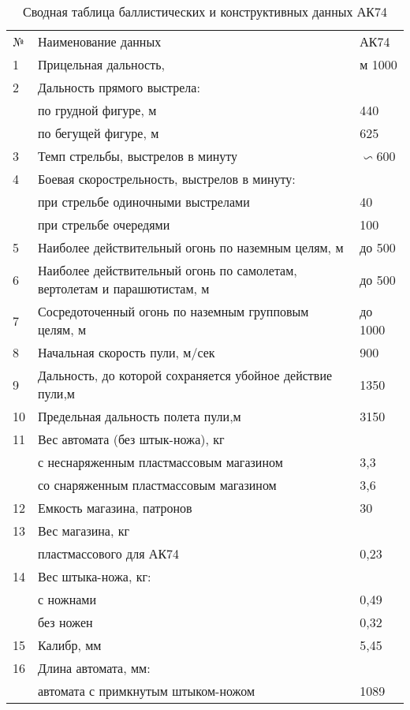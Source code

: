 \documentclass[12pt,a4paper]{report}
\begin{document}
\newpage
\begin{table}[h!]
\caption{Сводная таблица баллистических и конструктивных данных АК74}
\label{tabular:AK74}
\begin{center}
\begin{tabular}{|l|p{11cm}|l|}
	\hline
	\rowcolor[gray]{.9} № & Наименование данных &  АК74\\
	 1&		Прицельная дальность,&       м	1000\\
	 2&		Дальность прямого выстрела:&	 \\
	  &   	по грудной фигуре, м	&440\\
	  &  	по бегущей фигуре, м	&625\\
	 3&		Темп стрельбы, выстрелов в минуту	&$\backsim$600\\
	 4&		Боевая скорострельность, выстрелов в минуту:&	 \\
	  &		при стрельбе одиночными выстрелами	&40\\
	  &	 	при стрельбе очередями	&100\\
	 5&		Наиболее действительный огонь по наземным целям, м	&до 500\\
	 6&		Наиболее действительный огонь  по самолетам, вертолетам и парашютистам, м	&до 500\\
	 7&		Сосредоточенный огонь по наземным групповым целям, м	&до 1000\\
	 8&		Начальная скорость пули, м/сек	&900\\
	 9&	    Дальность, до которой сохраняется убойное действие пули,м &	1350\\
	 10&	Предельная дальность полета пули,м &	3150\\
	 11&	Вес автомата (без штык-ножа), кг &	 \\
	   &	 с неснаряженным пластмассовым магазином	&3,3\\
	   &	 со снаряженным пластмассовым магазином	&3,6\\
	 12&	Емкость магазина, патронов	&30\\
	 13&    Вес магазина, кг	& \\
	   &     пластмассового для АК74	&0,23\\
	 14&	Вес штыка-ножа, кг:&	 \\
	   &      с ножнами	&0,49\\
	   &    без ножен	&0,32\\
	 15&	Калибр, мм	&5,45\\
	 16&	Длина автомата, мм:	& \\
	   &	автомата с примкнутым штыком-ножом	&1089\\

\end{tabular}
\end{center}
\end{table}
\end{document}
